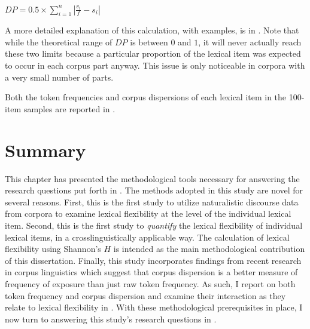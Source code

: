 \begin{exe}
  \ex\label{ex:DP}
  $DP = 0.5 \times \displaystyle\sum_{i = 1}^{n}|\frac{v_i}{f} - s_i|$
\end{exe}

\noindent A more detailed explanation of this calculation, with examples, is in \textcite[§3]{Gries2008}. Note that while the theoretical range of $DP$ is between $0$ and $1$, it will never actually reach these two limits because a particular proportion of the lexical item was expected to occur in each corpus part anyway. This issue is only noticeable in corpora with a very small number of parts.

Both the token frequencies and corpus dispersions of each lexical item in the 100-item samples are reported in .

\section{Summary}
\label{sec:3.5}

This chapter has presented the methodological tools necessary for answering the research questions put forth in . The methods adopted in this study are novel for several reasons. First, this is the first study to utilize naturalistic discourse data from corpora to examine lexical flexibility at the level of the individual lexical item. Second, this is the first study to \emph{quantify} the lexical flexibility of individual lexical items, in a crosslinguistically applicable way. The calculation of lexical flexibility using Shannon's $H$ is intended as the main methodological contribution of this dissertation. Finally, this study incorporates findings from recent research in corpus linguistics which suggest that corpus dispersion is a better measure of frequency of exposure than just raw token frequency. As such, I report on both token frequency and corpus dispersion and examine their interaction as they relate to lexical flexibility in . With these methodological prerequisites in place, I now turn to answering this study's research questions in .
